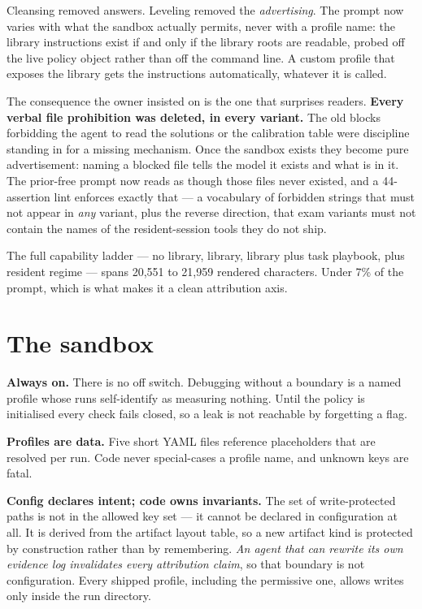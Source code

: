 \documentclass[11pt,a4paper]{report}
\newcommand{\keyrule}[1]{\textbf{\textcolor{acc}{#1}}}
\begin{document}
Cleansing removed answers. Leveling removed the \emph{advertising}. The prompt
now varies with what the sandbox actually permits, never with a profile name:
the library instructions exist if and only if the library roots are readable,
probed off the live policy object rather than off the command line. A custom
profile that exposes the library gets the instructions automatically, whatever
it is called.

The consequence the owner insisted on is the one that surprises readers.
\keyrule{Every verbal file prohibition was deleted, in every variant.} The old
blocks forbidding the agent to read the solutions or the calibration table were
discipline standing in for a missing mechanism. Once the sandbox exists they
become pure advertisement: naming a blocked file tells the model it exists and
what is in it. The prior-free prompt now reads as though those files never
existed, and a 44-assertion lint enforces exactly that --- a vocabulary of
forbidden strings that must not appear in \emph{any} variant, plus the reverse
direction, that exam variants must not contain the names of the resident-session
tools they do not ship.

The full capability ladder --- no library, library, library plus task playbook,
plus resident regime --- spans 20{,}551 to 21{,}959 rendered characters. Under
7\% of the prompt, which is what makes it a clean attribution axis.

\section{The sandbox}

\keyrule{Always on.} There is no off switch. Debugging without a boundary is a
named profile whose runs self-identify as measuring nothing. Until the policy is
initialised every check fails closed, so a leak is not reachable by forgetting a
flag.

\keyrule{Profiles are data.} Five short YAML files reference placeholders that are
resolved per run. Code never special-cases a profile name, and unknown keys are
fatal.

\keyrule{Config declares intent; code owns invariants.} The set of write-protected
paths is not in the allowed key set --- it cannot be declared in configuration
at all. It is derived from the artifact layout table, so a new artifact kind is
protected by construction rather than by remembering. \emph{An agent that can
rewrite its own evidence log invalidates every attribution claim}, so that
boundary is not configuration. Every shipped profile, including the permissive
one, allows writes only inside the run directory.
\end{document}
